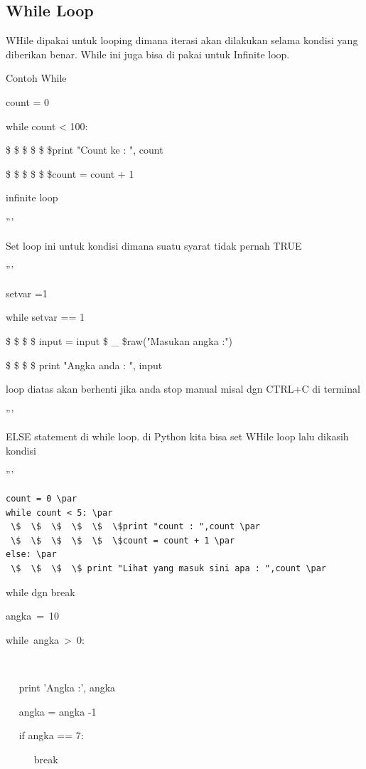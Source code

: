 \subsection{While Loop}
WHile dipakai untuk looping dimana iterasi akan dilakukan selama kondisi yang diberikan benar. While ini juga bisa di pakai untuk Infinite loop. \par
\vspace{12pt}
Contoh While \par
count = 0 \par
while count < 100: \par
 \$  \$  \$  \$  \$  \$print "Count ke : ", count \par
 \$  \$  \$  \$  \$  \$count = count + 1 \par
\vspace{12pt}
infinite loop \par
''' \par
Set loop ini untuk kondisi dimana suatu syarat tidak pernah TRUE \par
''' \par
\vspace{12pt}
setvar =1 \par
while setvar == 1 \par
 \$  \$  \$  \$ input = input \$  \_  \$raw("Masukan angka :") \par
 \$  \$  \$  \$ print "Angka anda : ", input \par
\vspace{12pt}
loop diatas akan berhenti jika anda stop manual misal dgn CTRL+C di terminal \par
''' \par
ELSE statement di while loop. di Python kita bisa set WHile loop lalu dikasih kondisi \par
''' \par
\begin{verbatim}
count = 0 \par
while count < 5: \par
 \$  \$  \$  \$  \$  \$print "count : ",count \par
 \$  \$  \$  \$  \$  \$count = count + 1 \par
else: \par
 \$  \$  \$  \$ print "Lihat yang masuk sini apa : ",count \par
 \end{verbatim}
\vspace{12pt}
while dgn break \par
angka~=~10~~~~~~    \par
while~angka~>~0:~~~~~~~~~~     \par
~~  \par
~~ print 'Angka :', angka \par
~~ angka = angka -1 \par
~~ if angka == 7: \par
~~~~~ break \par
\vspace{\baselineskip}
\vspace{12pt}
\vspace{12pt}

